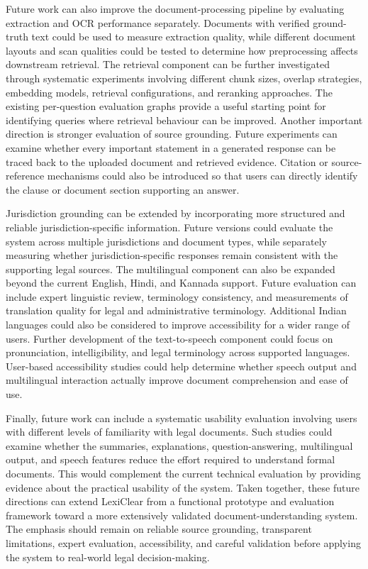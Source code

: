 \documentclass[12pt,a4paper,oneside]{report}
\begin{document}
Future work can also improve the document-processing pipeline by evaluating extraction and OCR performance separately. Documents with verified ground-truth text could be used to measure extraction quality, while different document layouts and scan qualities could be tested to determine how preprocessing affects downstream retrieval. The retrieval component can be further investigated through systematic experiments involving different chunk sizes, overlap strategies, embedding models, retrieval configurations, and reranking approaches. The existing per-question evaluation graphs provide a useful starting point for identifying queries where retrieval behaviour can be improved. Another important direction is stronger evaluation of source grounding. Future experiments can examine whether every important statement in a generated response can be traced back to the uploaded document and retrieved evidence. Citation or source-reference mechanisms could also be introduced so that users can directly identify the clause or document section supporting an answer.

Jurisdiction grounding can be extended by incorporating more structured and reliable jurisdiction-specific information. Future versions could evaluate the system across multiple jurisdictions and document types, while separately measuring whether jurisdiction-specific responses remain consistent with the supporting legal sources. The multilingual component can also be expanded beyond the current English, Hindi, and Kannada support. Future evaluation can include expert linguistic review, terminology consistency, and measurements of translation quality for legal and administrative terminology. Additional Indian languages could also be considered to improve accessibility for a wider range of users. Further development of the text-to-speech component could focus on pronunciation, intelligibility, and legal terminology across supported languages. User-based accessibility studies could help determine whether speech output and multilingual interaction actually improve document comprehension and ease of use.

Finally, future work can include a systematic usability evaluation involving users with different levels of familiarity with legal documents. Such studies could examine whether the summaries, explanations, question-answering, multilingual output, and speech features reduce the effort required to understand formal documents. This would complement the current technical evaluation by providing evidence about the practical usability of the system. Taken together, these future directions can extend LexiClear from a functional prototype and evaluation framework toward a more extensively validated document-understanding system. The emphasis should remain on reliable source grounding, transparent limitations, expert evaluation, accessibility, and careful validation before applying the system to real-world legal decision-making.
\end{document}
